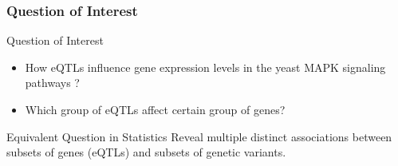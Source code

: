 \begin{frame}\frametitle{Question of Interest}
    \begin{block}{Question of Interest}
        \begin{itemize}
        \item How eQTLs influence gene expression levels in the yeast MAPK signaling pathways ?
        \item Which group of eQTLs affect certain group of genes?
        \end{itemize}
    \end{block}
    
    \begin{block}{Equivalent Question in Statistics}
        Reveal multiple distinct associations between subsets of genes (eQTLs) and subsets of genetic variants. 
    \end{block}
\end{frame}
